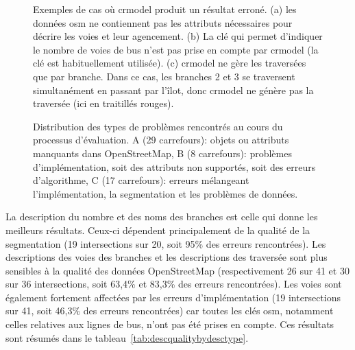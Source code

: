 \begin{figure}[ht]
\begin{subfigure}[t]{.3\linewidth}
        \caption{}
    \end{subfigure}
    \caption[Exemples de résultats erronés de crmodel]{Exemples de cas où crmodel produit un résultat erroné. (a) les données \gls{osm} ne contiennent pas les attributs nécessaires pour décrire les voies et leur agencement. (b) La clé  qui permet d'indiquer le nombre de voies de bus n'est pas prise en compte par crmodel (la clé  est habituellement utilisée). (c) crmodel ne gère les traversées que par branche. Dans ce cas, les branches 2 et 3 se traversent simultanément en passant par l'îlot, donc crmodel ne génère pas la traversée (ici en traitillés rouges).}
    \label{fig:eval_ex_err_crmodel}
\end{figure}


\begin{figure}[ht]
    \centering
    \caption[Types de problèmes rencontrés au cours du processus d'évaluation]{Distribution des types de problèmes rencontrés au cours du processus d'évaluation. A (29 carrefours): objets ou attributs manquants dans OpenStreetMap, B (8 carrefours): problèmes d'implémentation, soit des attributs non supportés, soit des erreurs d'algorithme, C (17 carrefours): erreurs mélangeant l'implémentation, la segmentation et les problèmes de données.}
    \label{fig:camissues}
\end{figure}

\newpar{}

La description du nombre et des noms des branches est celle qui donne les meilleurs résultats. Ceux-ci dépendent principalement de la qualité de la segmentation (19 intersections sur 20, soit 95\% des erreurs rencontrées). Les descriptions des voies des branches et les descriptions des traversée sont plus sensibles à la qualité des données OpenStreetMap (respectivement 26 sur 41 et 30 sur 36 intersections, soit 63,4\% et 83,3\% des erreurs rencontrées). Les voies sont également fortement affectées par les erreurs d'implémentation (19 intersections sur 41, soit 46,3\% des erreurs rencontrées) car toutes les clés \gls{osm}, notamment celles relatives aux lignes de bus, n'ont pas été prises en compte.  Ces résultats sont résumés dans le tableau~\ref{tab:descqualitybydesctype}.

